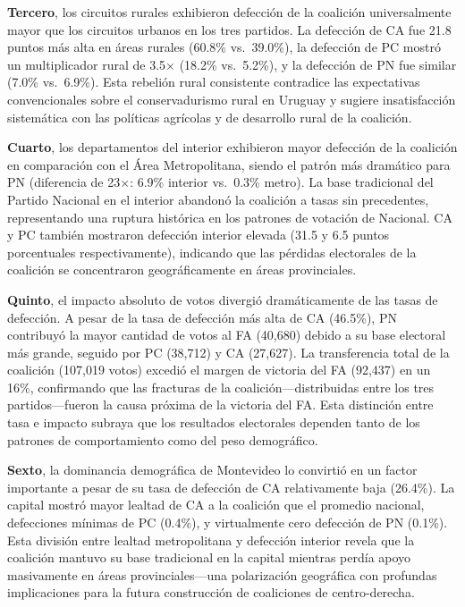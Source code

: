 \textbf{Tercero}, los circuitos rurales exhibieron defección de la coalición universalmente mayor que los circuitos urbanos en los tres partidos. La defección de CA fue 21.8 puntos más alta en áreas rurales (60.8\% vs.\ 39.0\%), la defección de PC mostró un multiplicador rural de 3.5$\times$ (18.2\% vs.\ 5.2\%), y la defección de PN fue similar (7.0\% vs.\ 6.9\%). Esta rebelión rural consistente contradice las expectativas convencionales sobre el conservadurismo rural en Uruguay y sugiere insatisfacción sistemática con las políticas agrícolas y de desarrollo rural de la coalición.

\textbf{Cuarto}, los departamentos del interior exhibieron mayor defección de la coalición en comparación con el Área Metropolitana, siendo el patrón más dramático para PN (diferencia de 23$\times$: 6.9\% interior vs.\ 0.3\% metro). La base tradicional del Partido Nacional en el interior abandonó la coalición a tasas sin precedentes, representando una ruptura histórica en los patrones de votación de Nacional. CA y PC también mostraron defección interior elevada (31.5 y 6.5 puntos porcentuales respectivamente), indicando que las pérdidas electorales de la coalición se concentraron geográficamente en áreas provinciales.

\textbf{Quinto}, el impacto absoluto de votos divergió dramáticamente de las tasas de defección. A pesar de la tasa de defección más alta de CA (46.5\%), PN contribuyó la mayor cantidad de votos al FA (40,680) debido a su base electoral más grande, seguido por PC (38,712) y CA (27,627). La transferencia total de la coalición (107,019 votos) excedió el margen de victoria del FA (92,437) en un 16\%, confirmando que las fracturas de la coalición---distribuidas entre los tres partidos---fueron la causa próxima de la victoria del FA. Esta distinción entre tasa e impacto subraya que los resultados electorales dependen tanto de los patrones de comportamiento como del peso demográfico.

\textbf{Sexto}, la dominancia demográfica de Montevideo lo convirtió en un factor importante a pesar de su tasa de defección de CA relativamente baja (26.4\%). La capital mostró mayor lealtad de CA a la coalición que el promedio nacional, defecciones mínimas de PC (0.4\%), y virtualmente cero defección de PN (0.1\%). Esta división entre lealtad metropolitana y defección interior revela que la coalición mantuvo su base tradicional en la capital mientras perdía apoyo masivamente en áreas provinciales---una polarización geográfica con profundas implicaciones para la futura construcción de coaliciones de centro-derecha.

